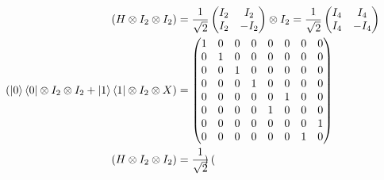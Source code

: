 \documentclass[10pt]{article}
\theoremstyle{definition}
\begin{document}
\begin{align*}
  (H\otimes I_2 \otimes I_2)                                                  & =\frac{1}{\sqrt{2}}\begin{pmatrix}
                                                                                                     I_2 & I_2  \\
                                                                                                     I_2 & -I_2
                                                                                                   \end{pmatrix}\otimes I_2
  =\frac{1}{\sqrt{2}}\begin{pmatrix}
                       I_4 & I_4  \\
                       I_4 & -I_4
                     \end{pmatrix}                                                                                                  \\
  (\ket{0}\bra{0}\otimes I_2\otimes I_2 + \ket{1}\bra{1}\otimes I_2\otimes X) & =\begin{pmatrix}
                                                                                   1 & 0 & 0 & 0 & 0 & 0 & 0 & 0 \\
                                                                                   0 & 1 & 0 & 0 & 0 & 0 & 0 & 0 \\
                                                                                   0 & 0 & 1 & 0 & 0 & 0 & 0 & 0 \\
                                                                                   0 & 0 & 0 & 1 & 0 & 0 & 0 & 0 \\
                                                                                   0 & 0 & 0 & 0 & 0 & 1 & 0 & 0 \\
                                                                                   0 & 0 & 0 & 0 & 1 & 0 & 0 & 0 \\
                                                                                   0 & 0 & 0 & 0 & 0 & 0 & 0 & 1 \\
                                                                                   0 & 0 & 0 & 0 & 0 & 0 & 1 & 0
                                                                                 \end{pmatrix}                       \\
  (H\otimes I_2 \otimes I_2)                                                  & =\frac{1}{\sqrt{2}}\begin{pmatrix}

\end{pmatrix}
\end{align*}
\end{document}
